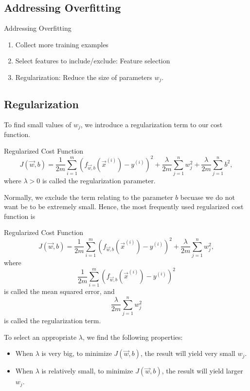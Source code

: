 \documentclass[12pt,a4paper]{article}
\begin{document}
\subsection{Addressing Overfitting}
\begin{rmkbox}{Addressing Overfitting}
	\begin{enumerate}
		\item Collect more training examples
		\item Select features to include/exclude: Feature selection
		\item Regularization: Reduce the size of parameters $w_j$.
	\end{enumerate}	
\end{rmkbox}

\subsection{Regularization}
\quad To find small values of $w_j$, we introduce a regularization term to our cost function. 
\begin{thmbox}{Regularized Cost Function}
	$$J(\vec{w},b)=\frac{1}{2m}\sum_{i=1}^m\left(f_{\vec{w},b}(\vec{x}^{(i)})-y^{(i)}\right)^2+\frac{\lambda}{2m}\sum_{j=1}^nw_j^2+\frac{\lambda}{2m}\sum_{j=1}^nb^2,$$
	where $\lambda>0$ is called the regularization parameter. 
\end{thmbox}

Normally, we exclude the term relating to the parameter $b$ becuase we do not want be to be extremely small. Hence, the most frequently used regularized cost function is 
\begin{thmbox}{Regularized Cost Function}
	$$J(\vec{w},b)=\frac{1}{2m}\sum_{i=1}^m\left(f_{\vec{w},b}(\vec{x}^{(i)})-y^{(i)}\right)^2+\frac{\lambda}{2m}\sum_{j=1}^nw_j^2,$$
	where $$\frac{1}{2m}\sum_{i=1}^m(f_{\vec{w},b}(\vec{x}^{(i)})-y^{(i)})^2$$ is called the mean squared error, and $$\frac{\lambda}{2m}\sum_{j=1}^nw_j^2$$ is called the regularization term. 
\end{thmbox}

To select an appropriate $\lambda$, we find the following properties: 
\begin{itemize}
	\item When $\lambda$ is very big, to minimize $J(\vec{w},b)$, the result will yield very small $w_j$.
	\item When $\lambda$ is relatively small, to minimize $J(\vec{w},b)$, the result will yield larger $w_j$.
\end{itemize}
\end{document}
